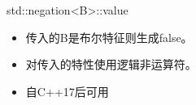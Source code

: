 std::negation<B>::value

\begin{itemize}
\item 
传入的B是布尔特征则生成false。

\item 
对传入的特性使用逻辑非运算符。

\item 
自C++17后可用
\end{itemize}












